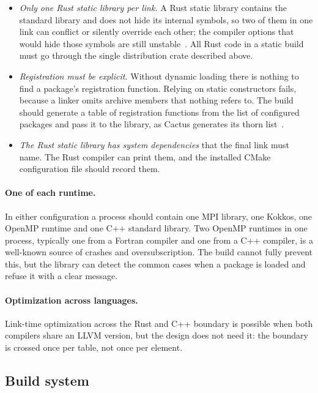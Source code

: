\documentclass[11pt,a4paper]{article}
\begin{document}
\begin{itemize}
  \item \emph{Only one Rust static library per link.}  A Rust static library
        contains the standard library and does not hide its internal symbols,
        so two of them in one link can conflict or silently override each
        other; the compiler options that would hide those symbols are still
        unstable~\cite{ruststaticlib}.  All Rust code in a
        static build must go through the single distribution crate described
        above.
  \item \emph{Registration must be explicit.}  Without dynamic loading there
        is nothing to find a package's registration function.  Relying on
        static constructors fails, because a linker omits archive members
        that nothing refers to.  The build should generate a table of
        registration functions from the list of configured packages and pass
        it to the library, as Cactus generates its thorn
        list~\cite{cactus}.
  \item \emph{The Rust static library has system dependencies} that the
        final link must name.  The Rust compiler can print them, and the
        installed CMake configuration file should record them.
\end{itemize}

\paragraph{One of each runtime.}  In either configuration a process should
contain one MPI library, one Kokkos, one OpenMP runtime and one C++ standard
library.  Two OpenMP runtimes in one process, typically one from a Fortran
compiler and one from a C++ compiler, is a well-known source of crashes and
oversubscription.  The build cannot fully prevent this, but the library can
detect the common cases when a package is loaded and refuse it with a clear
message.

\paragraph{Optimization across languages.}  Link-time optimization across
the Rust and C++ boundary is possible when both compilers share an LLVM
version, but the design does not need it: the boundary is crossed once per
table, not once per element.

\subsection{Build system}
\end{document}
